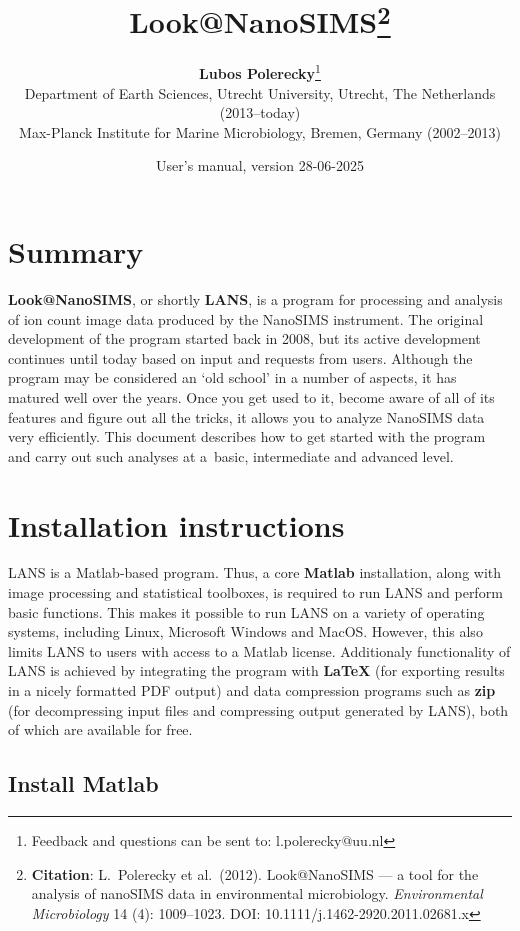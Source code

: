 \documentclass[a4paper, 11pt]{article}
\title{{\LARGE \bf Look@NanoSIMS}\footnote{\textbf{Citation}: L.~Polerecky et al.~(2012). Look@NanoSIMS --- a tool for the analysis of nanoSIMS data in environmental microbiology. \textit{Environmental Microbiology} 14 (4): 1009--1023. DOI: 10.1111/j.1462-2920.2011.02681.x}}
\author{{\large\bf Lubos Polerecky}\footnote{Feedback and questions can be sent to: l.polerecky@uu.nl}\\[6mm]
{\small Department of Earth Sciences, Utrecht University, Utrecht, The Netherlands (2013--today)} \\%
{\small Max-Planck Institute for Marine Microbiology, Bremen, Germany (2002--2013)}\\[3mm]}
\date{User's manual, version 28-06-2025}
\begin{document}
\maketitle
\reversemarginpar 


\section*{Summary}
\textbf{Look@NanoSIMS}, or shortly \textbf{LANS}, is a program for processing and analysis of ion count image data produced by the NanoSIMS instrument. The original development of the program started back in 2008, but its active development continues until today based on input and requests from users. Although the program may be considered an `old school' in a number of aspects, it has matured well over the years. Once you get used to it, become aware of all of its features and figure out all the tricks, it allows you to analyze NanoSIMS data very efficiently. This document describes how to get started with the program and carry out such analyses at a~basic, intermediate and advanced level. 


\tableofcontents

\section{Installation instructions}

LANS is a Matlab-based program. Thus, a core \textbf{Matlab} installation, along with image processing and statistical toolboxes, is required to run LANS and perform basic functions. This makes it possible to run LANS on a variety of operating systems, including Linux, Microsoft Windows and MacOS. However, this also limits LANS to users with access to a Matlab license. Additionaly functionality of LANS is achieved by integrating the program with \textbf{\LaTeX} (for exporting results in a nicely formatted PDF output) and data compression programs such as \textbf{zip} (for decompressing input files and compressing output generated by LANS), both of which are available for free.


\subsection{Install Matlab}
\end{document}
